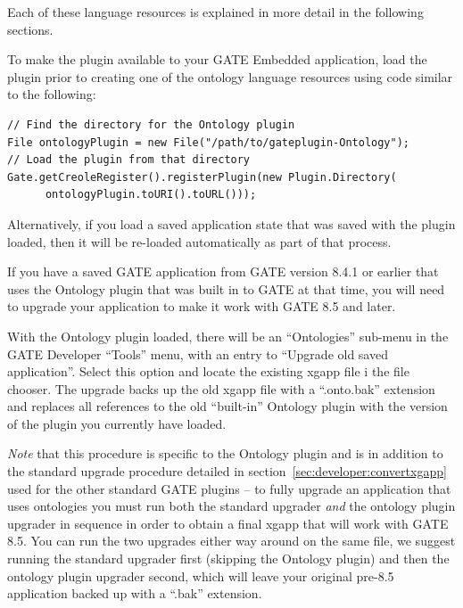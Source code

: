 Each of these language resources is explained in more detail in the following sections.

To make the plugin available to your GATE Embedded application, load the plugin
prior to creating one of the ontology language resources using code similar to
the following:
\begin{lstlisting}
// Find the directory for the Ontology plugin
File ontologyPlugin = new File("/path/to/gateplugin-Ontology");
// Load the plugin from that directory
Gate.getCreoleRegister().registerPlugin(new Plugin.Directory(
      ontologyPlugin.toURI().toURL()));
\end{lstlisting}

Alternatively, if you load a saved application state that was saved with the
plugin loaded, then it will be re-loaded automatically as part of that process.


If you have a saved GATE application from GATE version 8.4.1 or earlier that
uses the Ontology plugin that was built in to GATE at that time, you will need
to upgrade your application to make it work with GATE 8.5 and later.

With the Ontology plugin loaded, there will be an ``Ontologies'' sub-menu in
the GATE Developer ``Tools'' menu, with an entry to ``Upgrade old saved
application''.  Select this option and locate the existing xgapp file i the
file chooser.  The upgrade backs up the old xgapp file with a ``.onto.bak''
extension and replaces all references to the old ``built-in'' Ontology plugin
with the version of the plugin you currently have loaded.

\emph{Note} that this procedure is specific to the Ontology plugin and is in
addition to the standard upgrade procedure detailed in
section~\ref{sec:developer:convertxgapp} used for the other standard GATE
plugins -- to fully upgrade an application that uses ontologies you must run
both the standard upgrader \emph{and} the ontology plugin upgrader in sequence
in order to obtain a final xgapp that will work with GATE 8.5.  You can run the
two upgrades either way around on the same file, we suggest running the
standard upgrader first (skipping the Ontology plugin) and then the ontology
plugin upgrader second, which will leave your original pre-8.5 application
backed up with a ``.bak'' extension.


